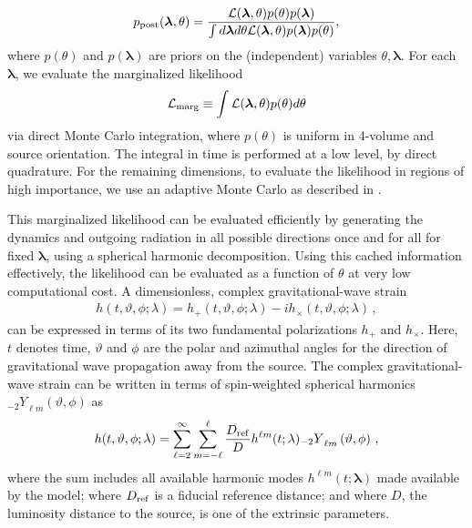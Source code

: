 \documentclass[twocolumn,prd,nofootinbib]{revtex4}
\newcommand\Y[1]{{{}_{#1}Y}}
\begin{document}
\begin{equation}
p_{\rm post}(\bm{\lambda} ,\theta)=\frac{ {\cal L}(\bm{\lambda} ,\theta)p(\theta)p(\bm{\lambda})}{\int d\bm{\lambda} d\theta {\cal L}(\bm{\lambda} ,\theta)p(\bm{\lambda})p(\theta)},
\end{equation}
where $p(\theta)$ and $p(\bm{\lambda})$ are priors on the (independent) variables $\theta ,\bm{\lambda}$. For each $\bm{\lambda}$, we evaluate the marginalized likelihood
\begin{equation}
 {\cal L}_{\rm marg}\equiv\int  {\cal L}(\bm{\lambda} ,\theta )p(\theta )d\theta
\end{equation}
via direct Monte Carlo integration, where $p(\theta)$ is uniform in 4-volume and source orientation.  
The integral in time is performed at a low level, by direct quadrature. 
For the remaining dimensions, to evaluate the likelihood in regions of high importance, we use an adaptive Monte Carlo as described in
\cite{gwastro-PE-AlternativeArchitectures}.    


This marginalized likelihood can be evaluated efficiently
by  generating the dynamics and outgoing radiation in all possible directions once and for all for fixed
$\mathbf{\lambda}$, using a spherical harmonic decomposition.  Using this cached information effectively,  the likelihood can be evaluated as a function of $\theta$ at very low computational cost.  
A dimensionless, complex gravitational-wave
strain
\begin{align} \label{eq:strain}
h(t,\vartheta,\phi;\lambda) =  h_+(t,\vartheta,\phi;\lambda) - 
                                i h_\times (t,\vartheta,\phi;\lambda) \, ,
\end{align}
can be expressed in terms of its two fundamental polarizations $h_+$ and $h_\times$.
Here, $t$ denotes time, $\vartheta$ and $\phi$ are the polar and azimuthal angles
for the direction of gravitational wave propagation away from the source. 
The complex gravitational-wave strain can be written in terms of
spin-weighted spherical harmonics $\Y{-2}_{\ell m} \left(\vartheta, \phi \right)$ as 
\begin{align} \label{eq:strain_mode}
h(t,\vartheta,\phi;\lambda) = 
\sum_{\ell=2}^{\infty} \sum_{m=-\ell}^{\ell} \frac{D_{\rm ref}}{D} h^{\ell m}(t;\lambda) \Y{-2}_{\ell m} \left(\vartheta, \phi \right) \, ,
\end{align}
where the sum includes all available harmonic modes $h^{\ell m}(t;\pmb{\lambda})$ made available by the model;  where
$D_{\rm ref}$ is a fiducial reference distance; and where $D$, the luminosity distance to the  source, is one of the
extrinsic parameters.  
\end{document}
